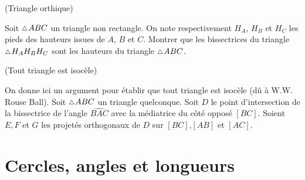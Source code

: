 \documentclass[a4paper,11pt,reqno]{amsart}
\begin{document}
\begin{exo}[.7] (Triangle orthique)

  Soit $\tri ABC$ un triangle non rectangle. On note respectivement $H_A$, $H_B$ et $H_C$ les pieds des hauteurs issues de $A$, $B$ et $C$. Montrer que les bissectrices du triangle $\tri H_AH_BH_C$ sont les hauteurs du triangle $\tri ABC$.
\end{exo}

\begin{exo} (Tout triangle est isocèle)

  On donne ici un argument pour établir que tout triangle est isocèle (dû à W.W. Rouse Ball).
  Soit $\tri ABC$ un triangle quelconque. Soit $D$ le point d'intersection de la bissectrice de l'angle $\widehat{BAC}$ avec la médiatrice du côté opposé $[BC]$. Soient $E,F$ et $G$ les projetés orthogonaux de $D$ sur $[BC]$,$[AB]$ et $[AC]$.\baselineskip
\end{exo}

\section{Cercles, angles et longueurs}
\end{document}
